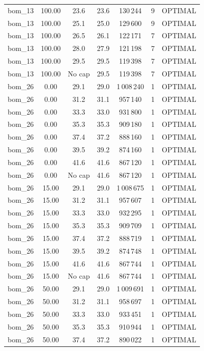 \begin{longtable}{lcccccc}
bom\_13 & 100.00 & 23.6 & 23.6 & 130\,244 & 9 & OPTIMAL \\
bom\_13 & 100.00 & 25.1 & 25.0 & 129\,600 & 9 & OPTIMAL \\
bom\_13 & 100.00 & 26.5 & 26.1 & 122\,171 & 7 & OPTIMAL \\
bom\_13 & 100.00 & 28.0 & 27.9 & 121\,198 & 7 & OPTIMAL \\
bom\_13 & 100.00 & 29.5 & 29.5 & 119\,398 & 7 & OPTIMAL \\
bom\_13 & 100.00 & No cap & 29.5 & 119\,398 & 7 & OPTIMAL \\
bom\_26 & 0.00 & 29.1 & 29.0 & 1\,008\,240 & 1 & OPTIMAL \\
bom\_26 & 0.00 & 31.2 & 31.1 & 957\,140 & 1 & OPTIMAL \\
bom\_26 & 0.00 & 33.3 & 33.0 & 931\,800 & 1 & OPTIMAL \\
bom\_26 & 0.00 & 35.3 & 35.3 & 909\,180 & 1 & OPTIMAL \\
bom\_26 & 0.00 & 37.4 & 37.2 & 888\,160 & 1 & OPTIMAL \\
bom\_26 & 0.00 & 39.5 & 39.2 & 874\,160 & 1 & OPTIMAL \\
bom\_26 & 0.00 & 41.6 & 41.6 & 867\,120 & 1 & OPTIMAL \\
bom\_26 & 0.00 & No cap & 41.6 & 867\,120 & 1 & OPTIMAL \\
bom\_26 & 15.00 & 29.1 & 29.0 & 1\,008\,675 & 1 & OPTIMAL \\
bom\_26 & 15.00 & 31.2 & 31.1 & 957\,607 & 1 & OPTIMAL \\
bom\_26 & 15.00 & 33.3 & 33.0 & 932\,295 & 1 & OPTIMAL \\
bom\_26 & 15.00 & 35.3 & 35.3 & 909\,709 & 1 & OPTIMAL \\
bom\_26 & 15.00 & 37.4 & 37.2 & 888\,719 & 1 & OPTIMAL \\
bom\_26 & 15.00 & 39.5 & 39.2 & 874\,748 & 1 & OPTIMAL \\
bom\_26 & 15.00 & 41.6 & 41.6 & 867\,744 & 1 & OPTIMAL \\
bom\_26 & 15.00 & No cap & 41.6 & 867\,744 & 1 & OPTIMAL \\
bom\_26 & 50.00 & 29.1 & 29.0 & 1\,009\,691 & 1 & OPTIMAL \\
bom\_26 & 50.00 & 31.2 & 31.1 & 958\,697 & 1 & OPTIMAL \\
bom\_26 & 50.00 & 33.3 & 33.0 & 933\,451 & 1 & OPTIMAL \\
bom\_26 & 50.00 & 35.3 & 35.3 & 910\,944 & 1 & OPTIMAL \\
bom\_26 & 50.00 & 37.4 & 37.2 & 890\,022 & 1 & OPTIMAL \\

\end{longtable}
